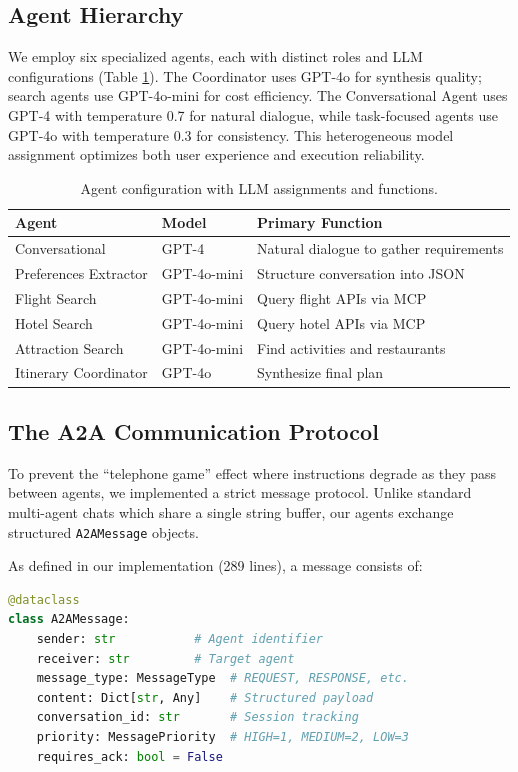 \documentclass[conference]{IEEEtran}
\begin{document}
\subsection{Agent Hierarchy}

We employ six specialized agents, each with distinct roles and LLM configurations (Table \ref{tab:agents}). The Coordinator uses GPT-4o for synthesis quality; search agents use GPT-4o-mini for cost efficiency. The Conversational Agent uses GPT-4 with temperature 0.7 for natural dialogue, while task-focused agents use GPT-4o with temperature 0.3 for consistency. This heterogeneous model assignment optimizes both user experience and execution reliability.

\begin{table}[h]
\centering
\small
\begin{tabular}{p{2.2cm}p{1.3cm}p{3.5cm}}
\toprule
\textbf{Agent} & \textbf{Model} & \textbf{Primary Function} \\
\midrule
Conversational & GPT-4 & Natural dialogue to gather requirements \\
Preferences Extractor & GPT-4o-mini & Structure conversation into JSON \\
Flight Search & GPT-4o-mini & Query flight APIs via MCP \\
Hotel Search & GPT-4o-mini & Query hotel APIs via MCP \\
Attraction Search & GPT-4o-mini & Find activities and restaurants \\
Itinerary Coordinator & GPT-4o & Synthesize final plan \\
\bottomrule
\end{tabular}
\caption{Agent configuration with LLM assignments and functions.}
\label{tab:agents}
\end{table}

\subsection{The A2A Communication Protocol}
To prevent the ``telephone game'' effect where instructions degrade as they pass between agents, we implemented a strict message protocol. Unlike standard multi-agent chats which share a single string buffer, our agents exchange structured \texttt{A2AMessage} objects.

As defined in our implementation (289 lines), a message consists of:
\begin{lstlisting}[language=Python, caption=A2AMessage Dataclass Definition]
@dataclass
class A2AMessage:
    sender: str           # Agent identifier
    receiver: str         # Target agent
    message_type: MessageType  # REQUEST, RESPONSE, etc.
    content: Dict[str, Any]    # Structured payload
    conversation_id: str       # Session tracking
    priority: MessagePriority  # HIGH=1, MEDIUM=2, LOW=3
    requires_ack: bool = False
\end{lstlisting}
\end{document}
